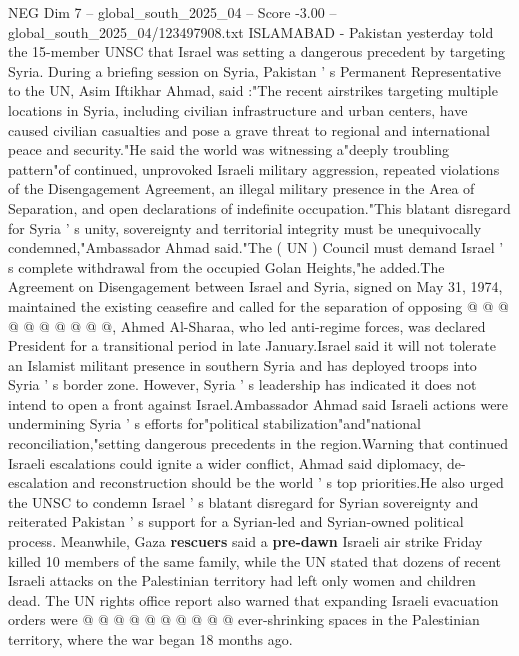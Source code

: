 \begin{textsample}{NEG Dim 7 – global\_south\_2025\_04 – Score -3.00 – global\_south\_2025\_04/123497908.txt}  \label{ex:f7_neg_043}
ISLAMABAD - Pakistan yesterday told the 15-member UNSC that Israel was setting a dangerous precedent by targeting Syria.
During a briefing session on Syria, Pakistan ' s Permanent Representative to the UN, Asim Iftikhar Ahmad, said :"The recent airstrikes targeting multiple locations in Syria, including civilian infrastructure and urban centers, have caused civilian casualties and pose a grave threat to regional and international peace and security."He said the world was witnessing a"deeply troubling pattern"of continued, unprovoked Israeli military aggression, repeated violations of the Disengagement Agreement, an illegal military presence in the Area of Separation, and open declarations of indefinite occupation."This blatant disregard for Syria ' s unity, sovereignty and territorial integrity must be unequivocally condemned,"Ambassador Ahmad said."The ( UN ) Council must demand Israel ' s complete withdrawal from the occupied Golan Heights,"he added.The Agreement on Disengagement between Israel and Syria, signed on May 31, 1974, maintained the existing ceasefire and called for the separation of opposing @ @ @ @ @ @ @ @ @ @, Ahmed Al-Sharaa, who led anti-regime forces, was declared President for a transitional period in late January.Israel said it will not tolerate an Islamist militant presence in southern Syria and has deployed troops into Syria ' s border zone.
However, Syria ' s leadership has indicated it does not intend to open a front against Israel.Ambassador Ahmad said Israeli actions were undermining Syria ' s efforts for"political stabilization"and"national reconciliation,"setting dangerous precedents in the region.Warning that continued Israeli escalations could ignite a wider conflict, Ahmad said diplomacy, de-escalation and reconstruction should be the world ' s top priorities.He also urged the UNSC to condemn Israel ' s blatant disregard for Syrian sovereignty and reiterated Pakistan ' s support for a Syrian-led and Syrian-owned political process.
Meanwhile, Gaza \textbf{rescuers} said a \textbf{pre-dawn} Israeli air strike Friday killed 10 members of the same family, while the UN stated that dozens of recent Israeli attacks on the Palestinian territory had left only women and children dead.
The UN rights office report also warned that expanding Israeli evacuation orders were @ @ @ @ @ @ @ @ @ @ ever-shrinking spaces in the Palestinian territory, where the war began 18 months ago.

\end{textsample}
